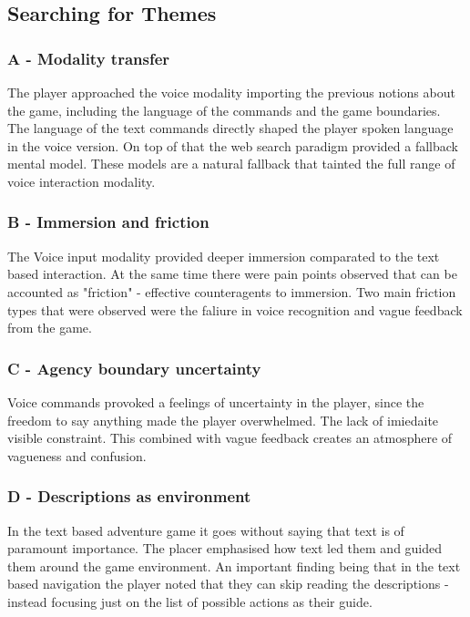 \subsection{Searching for Themes}

\subsubsection{A - Modality transfer}

The player approached the voice modality importing the previous notions about the game, including the language of the commands and the game boundaries.
The language of the text commands directly shaped the player spoken language in the voice version. On top of that the web search paradigm provided a fallback mental model.
These models are a natural fallback that tainted the full range of voice interaction modality.


\subsubsection{B - Immersion and friction}

The Voice input modality provided deeper immersion comparated to the text based interaction. At the same time there were pain points observed that can be accounted as "friction" - effective counteragents to immersion. Two main friction types that were observed were the faliure in voice recognition and vague feedback from the game. 

\subsubsection{C - Agency boundary uncertainty}

Voice commands provoked a feelings of uncertainty in the player, since the freedom to say anything made the player overwhelmed. The lack of imiedaite visible constraint. This combined with vague feedback creates an atmosphere of vagueness and confusion.

\subsubsection{D - Descriptions as environment}

In the text based adventure game it goes without saying that text is of paramount importance. The placer emphasised how text led them and guided them around the game environment. An important finding being that in the text based navigation the player noted that they can skip reading the descriptions - instead focusing just on the list of possible actions as their guide.






